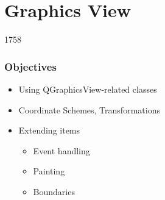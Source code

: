 %
%
%
%

\section{Graphics View}
\begin{slide}{1758}
\frametitle{Objectives}
\begin{itemize}
\item Using QGraphicsView-related classes
\item Coordinate Schemes, Transformations
\item Extending items
    \begin{itemize}
    \item Event handling
    \item Painting
    \item Boundaries
    \end{itemize}
\end{itemize}
\end{slide}

  



